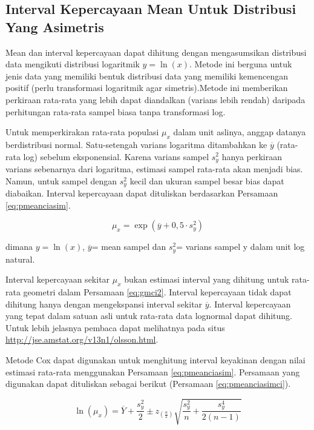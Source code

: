 \documentclass[]{book}
\begin{document}
\subsection{Interval Kepercayaan Mean Untuk Distribusi Yang
Asimetris}\label{interval-kepercayaan-mean-untuk-distribusi-yang-asimetris}

Mean dan interval kepercayaan dapat dihitung dengan mengasumsikan
distribusi data mengikuti distribusi logaritmik \(y=\ln{(x)}\). Metode
ini berguna untuk jenis data yang memiliki bentuk distribusi data yang
memiliki kemencengan positif (perlu transformasi logaritmik agar
simetris).Metode ini memberikan perkiraan rata-rata yang lebih dapat
diandalkan (varians lebih rendah) daripada perhitungan rata-rata sampel
biasa tanpa transformasi log.

Untuk memperkirakan rata-rata populasi \(\mu_x\) dalam unit aslinya,
anggap datanya berdistribusi normal. Satu-setengah varians logaritma
ditambahkan ke \(\overline{y}\) (rata-rata log) sebelum eksponensial.
Karena varians sampel \(s^2_y\) hanya perkiraan varians sebenarnya dari
logaritma, estimasi sampel rata-rata akan menjadi bias. Namun, untuk
sampel dengan \(s^2_y\) kecil dan ukuran sampel besar bias dapat
diabaikan. Interval kepercayaan dapat dituliskan berdasarkan Persamaan
\eqref{eq:pmeanciasim}.

\begin{equation}
  \mu_x=\exp\left(\overline{y}+0,5\cdot s_y^2\right)
  \label{eq:pmeanciasim}
\end{equation}

dimana \(y=\ln{(x)}\), \(\overline{y}\)= mean sampel dan \(s^2_y\)=
varians sampel y dalam unit log natural.

Interval kepercayaan sekitar \(\mu_x\) bukan estimasi interval yang
dihitung untuk rata-rata geometri dalam Persamaan \eqref{eq:gmci2}.
Interval kepercayaan tidak dapat dihitung hanya dengan mengekspansi
interval sekitar \(\overline{y}\). Interval kepercayaan yang tepat dalam
satuan asli untuk rata-rata data lognormal dapat dihitung. Untuk lebih
jelasnya pembaca dapat melihatnya pada situs
\url{http://jse.amstat.org/v13n1/olsson.html}.

Metode Cox dapat digunakan untuk menghitung interval keyakinan dengan
nilai estimasi rata-rata menggunakan Persamaan \eqref{eq:pmeanciasim}.
Persamaan yang digunakan dapat dituliskan sebagai berikut (Persamaan
\eqref{eq:pmeanciasimci}).

\begin{equation}
  \ln\left(\mu_x\right)=\overline{Y}+\frac{s_y^2}{2}\pm z_{\left(\frac{\alpha}{2}\right)}\sqrt{\frac{s_y^2}{n}+\frac{s_y^4}{2\left(n-1\right)}}
  \label{eq:pmeanciasimci}
\end{equation}
\end{document}

